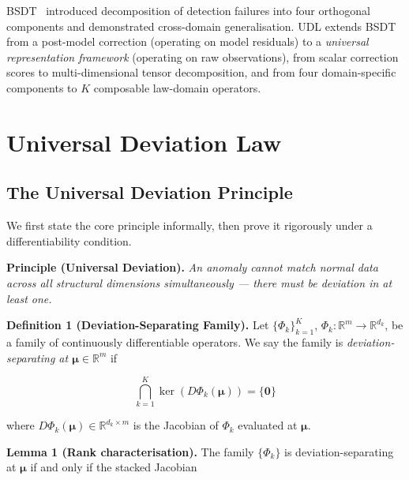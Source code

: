 \documentclass[journal]{IEEEtran}
\newcommand{\R}{\mathbb{R}}
\begin{document}
BSDT~\cite{odeyemi2025bsdt} introduced decomposition of detection failures into four orthogonal components and demonstrated cross-domain generalisation. UDL extends BSDT from a post-model correction (operating on model residuals) to a \textit{universal representation framework} (operating on raw observations), from scalar correction scores to multi-dimensional tensor decomposition, and from four domain-specific components to $K$ composable law-domain operators.

\section{Universal Deviation Law}
\label{sec:theory}

\subsection{The Universal Deviation Principle}
\label{ssec:axiom}

We first state the core principle informally, then prove it rigorously under a differentiability condition.

\textbf{Principle (Universal Deviation).} \textit{An anomaly cannot match normal data across all structural dimensions simultaneously --- there must be deviation in at least one.}

\vspace{0.5em}

\textbf{Definition 1 (Deviation-Separating Family).} Let $\{\Phi_k\}_{k=1}^K$, $\Phi_k: \R^m \to \R^{d_k}$, be a family of continuously differentiable operators. We say the family is \textit{deviation-separating at $\boldsymbol{\mu} \in \R^m$} if

\begin{equation}
\bigcap_{k=1}^{K} \ker\!\left(D\Phi_k(\boldsymbol{\mu})\right) = \{\mathbf{0}\}
\label{eq:separating}
\end{equation}

where $D\Phi_k(\boldsymbol{\mu}) \in \R^{d_k \times m}$ is the Jacobian of $\Phi_k$ evaluated at $\boldsymbol{\mu}$.

\vspace{0.5em}

\textbf{Lemma 1 (Rank characterisation).} The family $\{\Phi_k\}$ is deviation-separating at $\boldsymbol{\mu}$ if and only if the stacked Jacobian
\end{document}
